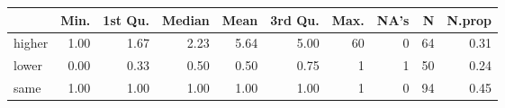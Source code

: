\begin{table}[ht]
\centering
\begin{tabular}{lrrrrrrrrr}
  \hline
 & Min. & 1st Qu. & Median & Mean & 3rd Qu. & Max. & NA's & N & N.prop \\ 
  \hline
higher & 1.00 & 1.67 & 2.23 & 5.64 & 5.00 &  60 &   0 &  64 & 0.31 \\ 
  lower & 0.00 & 0.33 & 0.50 & 0.50 & 0.75 &   1 &   1 &  50 & 0.24 \\ 
  same & 1.00 & 1.00 & 1.00 & 1.00 & 1.00 &   1 &   0 &  94 & 0.45 \\ 
   \hline
\end{tabular}
\end{table}
